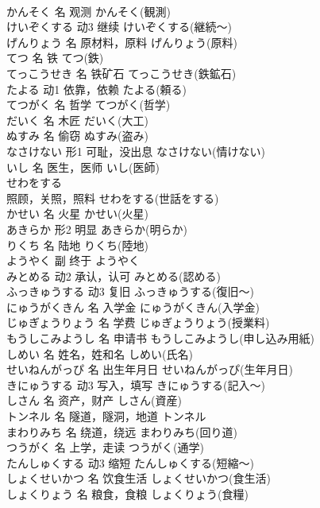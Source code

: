 \documentclass[8pt]{extreport}
\begin{document}
\begin{CJK}{UTF8}{min}
\\	かんそく	名	观测	かんそく(観測)	
\\	けいぞくする	动3	继续	けいぞくする(継続～)	
\\	げんりょう	名	原材料，原料	げんりょう(原料)	
\\	てつ	名	铁	てつ(鉄)	
\\	てっこうせき	名	铁矿石	てっこうせき(鉄鉱石)	
\\	たよる	动1	依靠，依赖	たよる(頼る)	
\\	てつがく	名	哲学	てつがく(哲学)	
\\	だいく	名	木匠	だいく(大工)	
\\	ぬすみ	名	偷窃	ぬすみ(盗み)	
\\	なさけない	形1	可耻，没出息	なさけない(情けない)	
\\	いし	名	医生，医师	いし(医師)	
\\	せわをする	
\\	照顾，关照，照料	せわをする(世話をする)	
\\	かせい	名	火星	かせい(火星)	
\\	あきらか	形2	明显	あきらか(明らか)	
\\	りくち	名	陆地	りくち(陸地)	
\\	ようやく	副	终于	ようやく	
\\	みとめる	动2	承认，认可	みとめる(認める)	
\\	ふっきゅうする	动3	复旧	ふっきゅうする(復旧～)	
\\	にゅうがくきん	名	入学金	にゅうがくきん(入学金)	
\\	じゅぎょうりょう	名	学费	じゅぎょうりょう(授業料)	
\\	もうしこみようし	名	申请书	もうしこみようし(申し込み用紙)	
\\	しめい	名	姓名，姓和名	しめい(氏名)	
\\	せいねんがっぴ	名	出生年月日	せいねんがっぴ(生年月日)	
\\	きにゅうする	动3	写入，填写	きにゅうする(記入～)	
\\	しさん	名	资产，财产	しさん(資産)	
\\	トンネル	名	隧道，隧洞，地道	トンネル	
\\	まわりみち	名	绕道，绕远	まわりみち(回り道)	
\\	つうがく	名	上学，走读	つうがく(通学)	
\\	たんしゅくする	动3	缩短	たんしゅくする(短縮～)	
\\	しょくせいかつ	名	饮食生活	しょくせいかつ(食生活)	
\\	しょくりょう	名	粮食，食粮	しょくりょう(食糧)	

\end{CJK}
\end{document}
